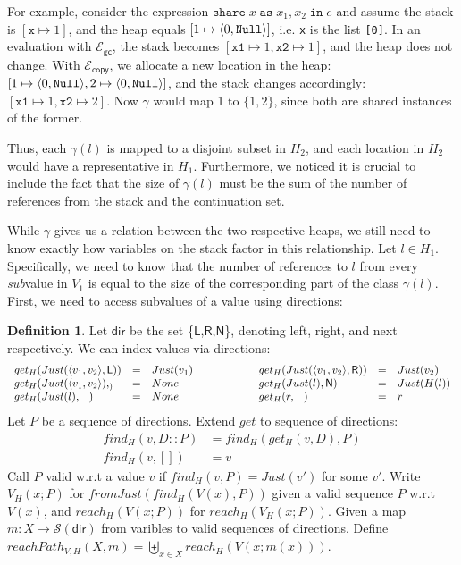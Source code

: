 \documentclass{easychair}
\newcommand{\ms}[1]{\ensuremath{\mathsf{#1}}}
\newcommand{\irl}[1]{\mathtt{#1}}
\newcommand{\sharecst}[4]{\irl{share}\;#1\;\irl{as}\;#2,#3\;\irl{in}\;#4}
\newcommand{\gcSem}{\ensuremath{\mathcal{E}_{\ms{gc}}}}
\newcommand{\copySem}{\ensuremath{\mathcal{E}_{\ms{copy}}}}
\theoremstyle{definition}
\newtheorem{definition}{Definition}
\begin{document}
For example, consider the expression $\sharecst{x}{x_1}{x_2}{e}$ and
assume the stack is $[\texttt{x} \mapsto 1]$, and the heap equals 
$[1 \mapsto \pairexcst{0}{\irl{Null}}]$, i.e. \texttt{x} is the list \texttt{[0]}.
In an evaluation with \gcSem{}, the stack becomes 
$[\texttt{x1} \mapsto 1,\texttt{x2} \mapsto 1]$, and the heap does not change. With 
\copySem, we allocate a new location in the heap:
$[1 \mapsto \pairexcst{0}{\irl{Null}},2 \mapsto \pairexcst{0}{\irl{Null}}]$, and the 
stack changes accordingly: $[\texttt{x1} \mapsto 1,\texttt{x2} \mapsto 2]$.
Now $\gamma$ would map 1 to $\{1,2\}$, since both are shared instances of the former.

Thus, each $\gamma(l)$ is mapped to a disjoint subset in $H_2$, and each location in $H_2$ 
would have a representative in $H_1$. Furthermore, we noticed it is crucial to include the 
fact that the size of $\gamma(l)$ must be the sum of the number of references from the stack and 
the continuation set. 

While $\gamma$ gives us a relation between the two respective heaps, we still need to know 
exactly how variables on the stack factor in this relationship. Let $l \in H_1$. 
Specifically, we need to know that the number of references to $l$ from every \emph{sub}value
in $V_1$ is equal to the size of the corresponding part of the class $\gamma(l)$.  
First, we need to access 
subvalues of a value using directions: 

\begin{definition}
	Let \ms{dir} be the set \{\ms{L},\ms{R},\ms{N}\}, denoting left, right, and next 
	respectively. We can index values via directions:
        $$
	\begin{array}{lclclcl}
		get_H(Just(\pairexcst{v_1}{v_2},\ms{L})) &=& Just(v_1) & \hspace{4em} &
		get_H(Just(\pairexcst{v_1}{v_2},\ms{R})) &=& Just(v_2)\\
		get_H(Just(\pairexcst{v_1}{v_2}),_) &=& None &&
		get_H(Just(l),\ms{N}) &=& Just(H(l)) \\
		get_H(Just(l), \_) &=& None &&
		get_H(r,\_) &=& r
	\end{array}
        $$
	Let $P$ be a sequence of directions. Extend $get$ to sequence of directions:
	\begin{align*}
		find_H(v,D::P) &= find_H(get_H(v,D),P)\\
		find_H(v,[]) &= v
	\end{align*}
	Call $P$ valid w.r.t a value $v$ if $find_H(v,P) = Just (v')$ for some $v'$.
	Write $V_H(x;P)$ for $fromJust(find_H(V(x),P))$ given a valid sequence $P$ w.r.t $V(x)$,
	and $reach_H(V(x;P))$ for $reach_H(V_H(x;P))$.
	Given a map $m : X \to \mathcal{S}(\ms{dir})$ from varibles to valid sequences of directions, 
	Define $reachPath_{V,H}(X,m) = \biguplus_{x \in X} reach_H(V(x;m(x)))$.
\end{definition}
\end{document}
